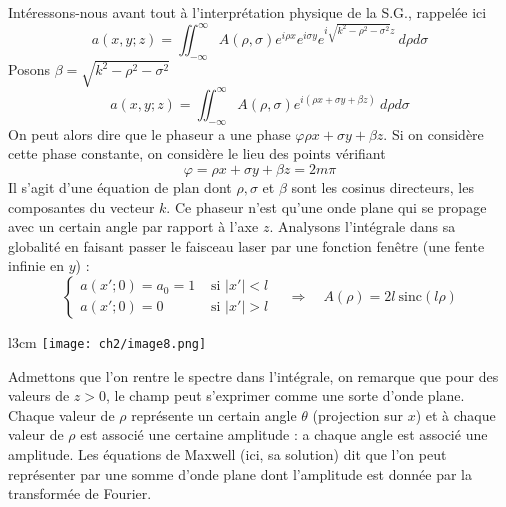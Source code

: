 Intéressons-nous avant tout à l'interprétation physique de la S.G., rappelée ici
\begin{equation}
a(x,y;z) = \iint_{-\infty}^\infty A(\rho,\sigma)e^{i\rho x}e^{i\sigma y} e^{i\sqrt{k^2-\rho^2-
\sigma^2}z}\ d\rho d\sigma
\end{equation}
Posons $\beta = \sqrt{k^2-\rho^2-\sigma^2}$
\begin{equation}
a(x,y;z) = \iint_{-\infty}^\infty A(\rho,\sigma)e^{i(\rho x + \sigma y + \beta z)}\ d\rho d\sigma
\end{equation}
On peut alors dire que le phaseur a une phase $\varphi \rho x + \sigma y + \beta z$. Si on considère 
cette phase constante, on considère le lieu des points vérifiant 
\begin{equation}
\varphi = \rho x + \sigma y + \beta z = 2m\pi
\end{equation}
Il s'agit d'une équation de plan dont $\rho,\sigma$ et $\beta$ sont les cosinus directeurs, les 
composantes du vecteur $k$. Ce phaseur n'est qu'une onde plane qui se propage avec un certain 
angle par rapport à l'axe $z$. Analysons l'intégrale dans sa globalité en faisant passer le 
faisceau laser par une fonction fenêtre (une fente infinie en $y$) :
\begin{equation}
\left\{\begin{array}{ll}
a(x';0) = a_0 = 1 & \text{ si } |x'| < l\\
a(x';0) = 0 & \text{ si } |x'| > l
\end{array}\right.\quad \Rightarrow\quad A(\rho) = 2l\ \text{sinc}(l\rho)
\end{equation}


\begin{wrapfigure}[7]{l}{3cm}
\vspace{-4mm}
\texttt{[image: ch2/image8.png]}
\end{wrapfigure}
Admettons que l'on rentre le spectre dans l'intégrale, on remarque que pour des valeurs de $z>0$, 
le champ peut s'exprimer comme une sorte d'onde plane. Chaque valeur de $\rho$ représente un certain 
angle $\theta$ (projection sur $x$) et à chaque valeur de $\rho$ est associé une certaine amplitude : 
a chaque angle est associé une amplitude. Les équations de Maxwell (ici, sa solution) dit que l'on 
peut représenter par une somme d'onde plane dont l'amplitude est donnée par la transformée de 
Fourier.\\

